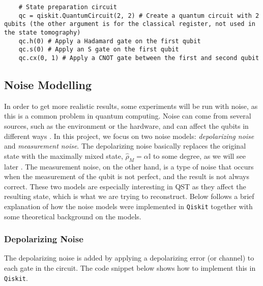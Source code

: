 \documentclass[a4paper,12pt]{article}
\begin{document}
\begin{tcolorbox}[title = {\footnotesize\textbf{Code Snippet, Quantum Circuit}}, colback=black!15!white, colframe=black]
    \begin{adjustwidth}{0.25cm}{0cm}
    
    {\footnotesize 
    \begin{verbatim}
    # State preparation circuit 
    qc = qiskit.QuantumCircuit(2, 2) # Create a quantum circuit with 2 qubits (the other argument is for the classical register, not used in the state tomography)
    qc.h(0) # Apply a Hadamard gate on the first qubit
    qc.s(0) # Apply an S gate on the first qubit
    qc.cx(0, 1) # Apply a CNOT gate between the first and second qubit
    \end{verbatim}
    }
    \end{adjustwidth}
\end{tcolorbox}

\subsection{Noise Modelling}
In order to get more realistic results, some experiments will be run with noise, as this is a common problem in quantum computing. Noise can come from several sources, such as the environment or the hardware, and can affect the qubits in different ways \cite{nielsen_chuang}. In this project, we focus on two noise models: \textit{depolarizing noise} and \textit{measurement noise}. The depolarizing noise basically replaces the original state with the maximally mixed state, $\hat{\rho}_M = \alpha\mathbb{I}$ to some degree, as we will see later \cite{nielsen_chuang}. The measurement noise, on the other hand, is a type of noise that occurs when the measurement of the qubit is not perfect, and the result is not always correct. These two models are especially interesting in QST as they affect the resulting state, which is what we are trying to reconstruct. Below follows a brief explanation of how the noise models were implemented in \texttt{Qiskit} together with some theoretical background on the models. 

\subsubsection{Depolarizing Noise}
The depolarizing noise is added by applying a depolarizing error (or channel) to each gate in the circuit. The code snippet below shows how to implement this in \texttt{Qiskit}.
\end{document}

